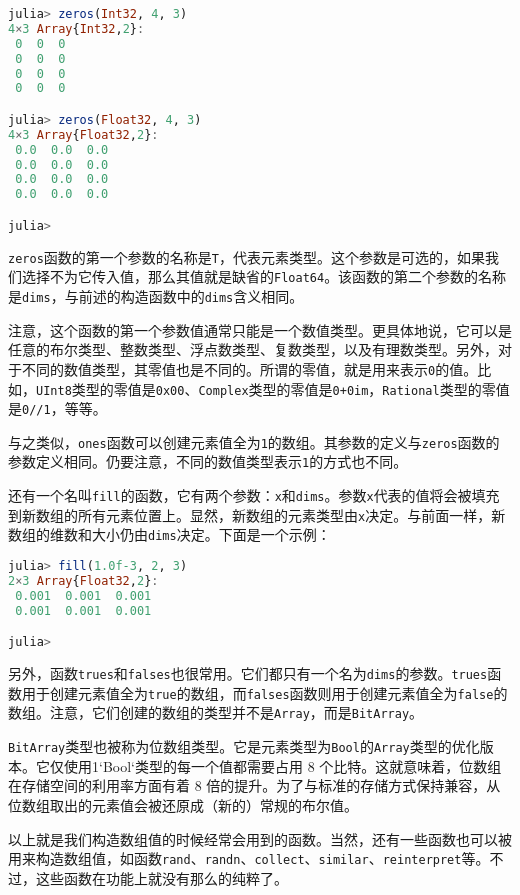 \begin{lstlisting}[language=julia]
julia> zeros(Int32, 4, 3)
4×3 Array{Int32,2}:
 0  0  0
 0  0  0
 0  0  0
 0  0  0

julia> zeros(Float32, 4, 3)
4×3 Array{Float32,2}:
 0.0  0.0  0.0
 0.0  0.0  0.0
 0.0  0.0  0.0
 0.0  0.0  0.0

julia> 
\end{lstlisting}

\verb|zeros|函数的第一个参数的名称是\verb|T|，代表元素类型。这个参数是可选的，如果我们选择不为它传入值，那么其值就是缺省的\verb|Float64|。该函数的第二个参数的名称是\verb|dims|，与前述的构造函数中的\verb|dims|含义相同。

注意，这个函数的第一个参数值通常只能是一个数值类型。更具体地说，它可以是任意的布尔类型、整数类型、浮点数类型、复数类型，以及有理数类型。另外，对于不同的数值类型，其零值也是不同的。所谓的零值，就是用来表示\verb|0|的值。比如，\verb|UInt8|类型的零值是\verb|0x00|、\verb|Complex|类型的零值是\verb|0+0im|，\verb|Rational|类型的零值是\verb|0//1|，等等。

与之类似，\verb|ones|函数可以创建元素值全为\verb|1|的数组。其参数的定义与\verb|zeros|函数的参数定义相同。仍要注意，不同的数值类型表示\verb|1|的方式也不同。

还有一个名叫\verb|fill|的函数，它有两个参数：\verb|x|和\verb|dims|。参数\verb|x|代表的值将会被填充到新数组的所有元素位置上。显然，新数组的元素类型由\verb|x|决定。与前面一样，新数组的维数和大小仍由\verb|dims|决定。下面是一个示例：

\begin{lstlisting}[language=julia]
julia> fill(1.0f-3, 2, 3)
2×3 Array{Float32,2}:
 0.001  0.001  0.001
 0.001  0.001  0.001

julia> 
\end{lstlisting}

另外，函数\verb|trues|和\verb|falses|也很常用。它们都只有一个名为\verb|dims|的参数。\verb|trues|函数用于创建元素值全为\verb|true|的数组，而\verb|falses|函数则用于创建元素值全为\verb|false|的数组。注意，它们创建的数组的类型并不是\verb|Array|，而是\verb|BitArray|。

\verb|BitArray|类型也被称为位数组类型。它是元素类型为\verb|Bool|的\verb|Array|类型的优化版本。它仅使用1`Bool`类型的每一个值都需要占用 8 个比特。这就意味着，位数组在存储空间的利用率方面有着 8 倍的提升。为了与标准的存储方式保持兼容，从位数组取出的元素值会被还原成（新的）常规的布尔值。

以上就是我们构造数组值的时候经常会用到的函数。当然，还有一些函数也可以被用来构造数组值，如函数\verb|rand|、\verb|randn|、\verb|collect|、\verb|similar|、\verb|reinterpret|等。不过，这些函数在功能上就没有那么的纯粹了。